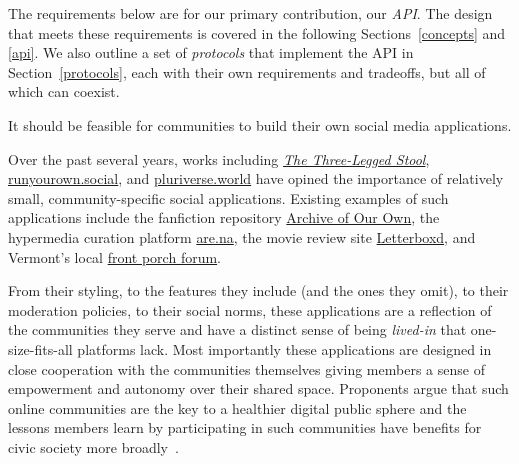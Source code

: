 The requirements below are for our primary contribution, our \emph{API}. The design that meets these
requirements is covered in the following Sections~\ref{concepts} and \ref{api}.
We also outline a set of \emph{protocols} that implement the API in Section~\ref{protocols}, each with their own
requirements and tradeoffs, but all of which can coexist.



\begin{requirement}
\label{requirements:easy}
   It should be feasible for communities to build
   their own social media applications.
\end{requirement}

Over the past several years,
works including
\emph{\href{https://publicinfrastructure.org/2023/03/29/the-three-legged-stool/}{The Three-Legged Stool}},
\href{https://runyourown.social}{runyourown.social},
and \href{https://pluriverse.world/}{pluriverse.world}
have opined the importance of relatively small,
community-specific social applications.
Existing examples of such applications include the fanfiction
repository \href{https://archiveofourown.org/}{Archive of Our Own},
the hypermedia curation platform \href{https://www.are.na}{are.na},
the movie review site \href{https://letterboxd.com/}{Letterboxd},
and Vermont's local \href{https://frontporchforum.com/}{front porch forum}.


%
From their styling, to the features they include (and the ones they omit),
to their moderation policies, to their social norms, these applications
are a reflection of the communities they serve and have a
distinct sense of being \emph{lived-in}
that one-size-fits-all platforms lack.
Most importantly these applications are designed in close cooperation with the communities themselves
giving members a sense of empowerment and autonomy over their shared space.
Proponents argue that such online communities are the key to a healthier
digital public sphere and the lessons members learn by participating in such
communities have benefits for civic society more broadly~\cite{threeleggedstool, runyourownsocial, archiveoftheirown}.


